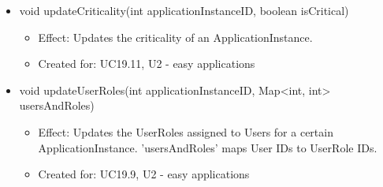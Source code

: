\begin{description}
\begin{itemize}[noitemsep,nolistsep,leftmargin=-.25cm]
\begin{itemize}
        \end{itemize}
      \item \textsf{void updateCriticality(int applicationInstanceID, boolean isCritical)}
        \begin{itemize}[noitemsep,nolistsep]
           \item Effect: Updates the criticality of an ApplicationInstance.
\item Created for: UC19.11, U2 - easy applications
        \end{itemize}
      \item \textsf{void updateUserRoles(int applicationInstanceID, Map\textless{}int, int\textgreater{} usersAndRoles)}
        \begin{itemize}[noitemsep,nolistsep]
           \item Effect: Updates the UserRoles assigned to Users for a certain ApplicationInstance. 'usersAndRoles' maps User IDs to UserRole IDs.
\item Created for: UC19.9, U2 - easy applications
        \end{itemize}
    \end{itemize}
    \end{description}

